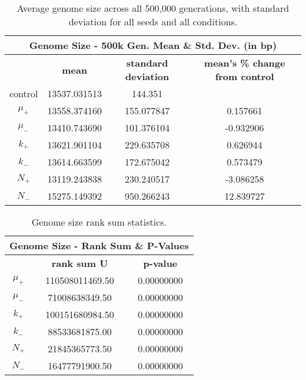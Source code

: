 \begin{table}[H]
	\begin{tabular}{|c|c|c|c|}
		\hline
		\multicolumn{4}{c}{\Large \textbf{Genome Size - 500k Gen. Mean \& Std. Dev. (in bp)}} \\
		\hline
		 & \textbf{mean} & \textbf{standard deviation} & \textbf{mean's \% change from control} \\
		 \hline
		 control & 13537.031513 & 144.351 & \textemdash \\ 
		 \hline
		 $\mu_+$ & 13558.374160 & 155.077847 & 0.157661 \\ 
		 \hline
		 $\mu_-$ & 13410.743690 & 101.376104 & -0.932906 \\ 
		 \hline
		 $k_+$ & 13621.901104 & 229.635708 & 0.626944 \\ 
		 \hline
		 $k_-$ & 13614.663599 & 172.675042 & 0.573479 \\ 
		 \hline
		 $N_+$ & 13119.243838 & 230.240517 & -3.086258 \\ 
		 \hline
		 $N_-$ & 15275.149392 & 950.266243 & 12.839727 \\ 
		 \hline
	\end{tabular}
	\caption[Genome size - mean and std. dev.]{Average genome size across all 500,000 generations, with standard deviation for all seeds and all conditions. }
	\label{table:genome_size_mean_and_std_dev}
\end{table}

\begin{table}[H]
	\centering
	\begin{tabular}{|c|c|c|}
		\hline
		\multicolumn{3}{c}{\Large Genome Size - Rank Sum \& P-Values} \\
		\hline
		& \textbf{rank sum U} & \textbf{p-value} \\
		\hline\hline
		$\mu_+$ & 110508011469.50 & 0.00000000 \\ 
		\hline
		$\mu_-$ & 71008638349.50 & 0.00000000 \\ 
		\hline
		$k_+$ & 100151680984.50 & 0.00000000 \\ 
		\hline
		$k_-$ & 88533681875.00 & 0.00000000 \\ 
		\hline
		$N_+$ & 21845365773.50 & 0.00000000 \\ 
		\hline
		$N_-$ & 16477791900.50 & 0.00000000 \\ 
		\hline
	\end{tabular}
	\caption[Genome size rank sum statistics]{Genome size rank sum statistics.}
	\label{table:genome_size_stats}
\end{table} 

